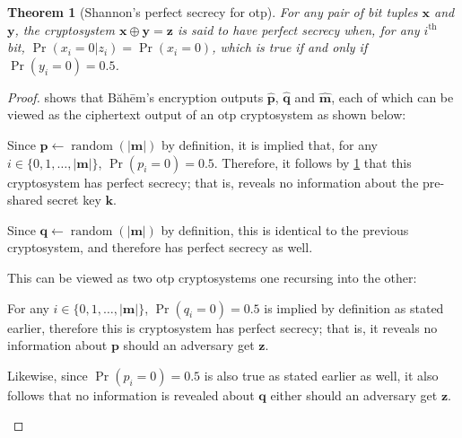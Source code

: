 \documentclass[twocolumn,hidelinks]{article}
\newcommand{\baheem}{Băhēm}
\DeclareMathOperator{\random}{random}
\newtheorem{theorem}{Theorem}[section]
\begin{document}
\begin{theorem}[Shannon's perfect secrecy for \gls{otp}]
    For any pair of bit tuples $\mathbf{x}$ and $\mathbf{y}$, the cryptosystem
    $\mathbf{x} \oplus \mathbf{y} = \mathbf{z}$ is said to have \emph{perfect
    secrecy} when, for any $i^{\text{th}}$ bit, $\Pr(x_i=0 | z_i) =\Pr(x_i=0)$,
    which is true if and only if $\Pr(y_i=0) = 0.5$.
    \label{thrm_otp_perfect_secrecy}
\end{theorem}

\begin{proof}
 shows that \baheem's encryption outputs
    $\mathbf{\hat p}$, $\mathbf{\hat q}$ and $\mathbf{\hat m}$, each of
    which can be viewed as the ciphertext output of an \gls{otp}
    cryptosystem as shown below:
\begin{description}[itemsep=0em]
    \item[$\mathbf{k} \oplus \mathbf{p} = \mathbf{\hat p}$.] Since
        $\mathbf{p} \gets \random(|\mathbf{m}|)$ by definition, it is
        implied that, for any $i \in \{0, 1, \ldots, |\mathbf{m}|\}$,
        $\Pr(p_i=0) = 0.5$. Therefore, it follows by
        \cref{thrm_otp_perfect_secrecy} that this cryptosystem has perfect
        secrecy; that is, reveals no information about the pre-shared
        secret key $\mathbf{k}$.

    \item[$\mathbf{k} \oplus \mathbf{q} = \mathbf{\hat q}$.] Since
        $\mathbf{q} \gets \random(|\mathbf{m}|)$ by definition, this is
        identical to the previous cryptosystem, and therefore has perfect
        secrecy as well.

    \item[$\mathbf{p} \oplus \mathbf{q} \oplus \mathbf{m} = \mathbf{\hat
        m}$.] This can be viewed as two \gls{otp} cryptosystems one
        recursing into the other:
        \begin{description}[itemsep=0em]
            \item[$\mathbf{p} \oplus \mathbf{q} = \mathbf{z}$.]  For any $i
                \in \{0, 1, \ldots, |\mathbf{m}|\}$, $\Pr(q_i=0) = 0.5$ is
                implied by definition as stated earlier, therefore this is
                cryptosystem has perfect secrecy; that is, it reveals no
                information about $\mathbf{p}$ should an adversary get
                $\mathbf{z}$.

                Likewise, since $\Pr(p_i=0) = 0.5$ is also true as stated
                earlier as well, it also follows that no information is
                revealed about $\mathbf{q}$ either should an adversary get
                $\mathbf{z}$.


\end{description}
\end{description}
\end{proof}
\end{document}
